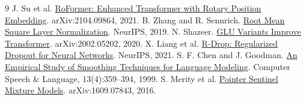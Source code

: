 \documentclass[11pt,a4paper]{article}
\begin{document}
\begingroup\raggedright
\begin{thebibliography}{9}
 J. Su et al. \href{https://arxiv.org/abs/2104.09864}{RoFormer: Enhanced Transformer with Rotary Position Embedding}. arXiv:2104.09864, 2021.
 B. Zhang and R. Sennrich. \href{https://arxiv.org/abs/1910.07467}{Root Mean Square Layer Normalization}. NeurIPS, 2019.
 N. Shazeer. \href{https://arxiv.org/abs/2002.05202}{GLU Variants Improve Transformer}. arXiv:2002.05202, 2020.
 X. Liang et al. \href{https://arxiv.org/abs/2106.14448}{R-Drop: Regularized Dropout for Neural Networks}. NeurIPS, 2021.
 S. F. Chen and J. Goodman. \href{https://doi.org/10.1006/csla.1999.0128}{An Empirical Study of Smoothing Techniques for Language Modeling}. Computer Speech \& Language, 13(4):359--394, 1999.
 S. Merity et al. \href{https://arxiv.org/abs/1609.07843}{Pointer Sentinel Mixture Models}. arXiv:1609.07843, 2016.
\end{thebibliography}
\endgroup
\end{document}
